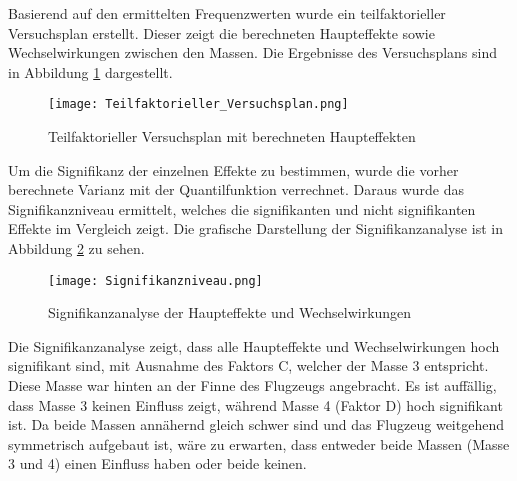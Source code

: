     \noindent
    Basierend auf den ermittelten Frequenzwerten wurde ein teilfaktorieller Versuchsplan erstellt. 
    Dieser zeigt die berechneten Haupteffekte sowie Wechselwirkungen zwischen den Massen.  
    Die Ergebnisse des Versuchsplans sind in Abbildung \ref{fig: Teilfaktorieller_Versuchsplan} dargestellt.
    
    \begin{figure}[H]
        \centering
        \texttt{[image: Teilfaktorieller\_Versuchsplan.png]}
        \caption{Teilfaktorieller Versuchsplan mit berechneten Haupteffekten}
        \label{fig: Teilfaktorieller_Versuchsplan}
    \end{figure}
    
    \noindent
    Um die Signifikanz der einzelnen Effekte zu bestimmen, wurde die vorher berechnete Varianz mit 
    der Quantilfunktion verrechnet. Daraus wurde das Signifikanzniveau ermittelt, welches die signifikanten 
    und nicht signifikanten Effekte im Vergleich zeigt. Die grafische Darstellung der Signifikanzanalyse 
    ist in Abbildung \ref{fig: Signifikanzniveau} zu sehen.
    
    \begin{figure}[H]
        \centering
        \texttt{[image: Signifikanzniveau.png]}
        \caption{Signifikanzanalyse der Haupteffekte und Wechselwirkungen}
        \label{fig: Signifikanzniveau}
    \end{figure}

    \noindent
    Die Signifikanzanalyse zeigt, dass alle Haupteffekte und Wechselwirkungen hoch signifikant sind, 
    mit Ausnahme des Faktors C, welcher der Masse 3 entspricht. Diese Masse war hinten an der Finne des Flugzeugs angebracht. 
    Es ist auffällig, dass Masse 3 keinen Einfluss zeigt, während Masse 4 (Faktor D) hoch signifikant ist.  
    Da beide Massen annähernd gleich schwer sind und das Flugzeug weitgehend symmetrisch aufgebaut ist, 
    wäre zu erwarten, dass entweder beide Massen (Masse 3 und 4) einen Einfluss haben oder beide keinen.  